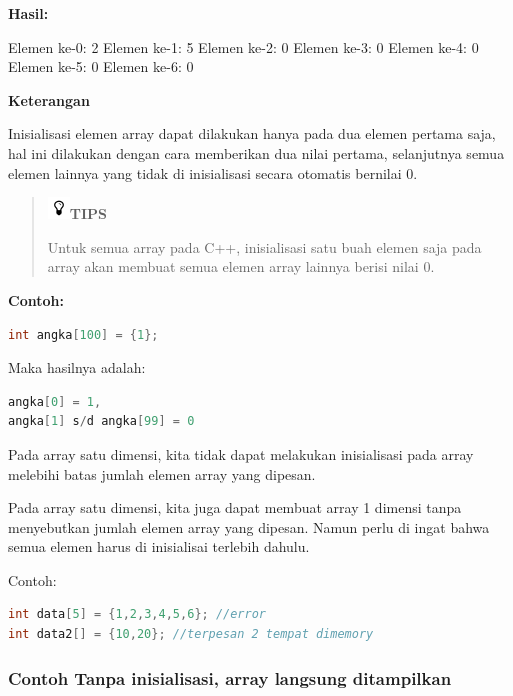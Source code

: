 \textbf{Hasil:}

\begin{lcverbatim}
Elemen ke-0: 2
Elemen ke-1: 5
Elemen ke-2: 0
Elemen ke-3: 0
Elemen ke-4: 0
Elemen ke-5: 0
Elemen ke-6: 0
\end{lcverbatim}

\textbf{Keterangan}

Inisialisasi elemen array dapat dilakukan hanya pada dua elemen pertama
saja, hal ini dilakukan dengan cara memberikan dua nilai pertama,
selanjutnya semua elemen lainnya yang tidak di inisialisasi secara
otomatis bernilai 0.

\begin{quotation}
\includegraphics{../manuscript/images/tips.png}\textbf{TIPS}

Untuk
semua array pada C++, inisialisasi satu buah elemen saja pada array akan
membuat semua elemen array lainnya berisi nilai 0.
\end{quotation}
 

\textbf{Contoh:}

\begin{lstlisting}[language=c++, numbers=none]
int angka[100] = {1};
\end{lstlisting}

Maka hasilnya adalah:

\begin{lstlisting}[language=c++, numbers=none]
angka[0] = 1,
angka[1] s/d angka[99] = 0
\end{lstlisting}

Pada array satu dimensi, kita tidak dapat melakukan inisialisasi pada
array melebihi batas jumlah elemen array yang dipesan.

Pada array satu dimensi, kita juga dapat membuat array 1 dimensi tanpa
menyebutkan jumlah elemen array yang dipesan. Namun perlu di ingat bahwa
semua elemen harus di inisialisai terlebih dahulu.

Contoh:

\begin{lstlisting}[language=c++, numbers=none]
int data[5] = {1,2,3,4,5,6}; //error
int data2[] = {10,20}; //terpesan 2 tempat dimemory
\end{lstlisting}

\subsubsection*{Contoh  Tanpa inisialisasi, array langsung ditampilkan}

